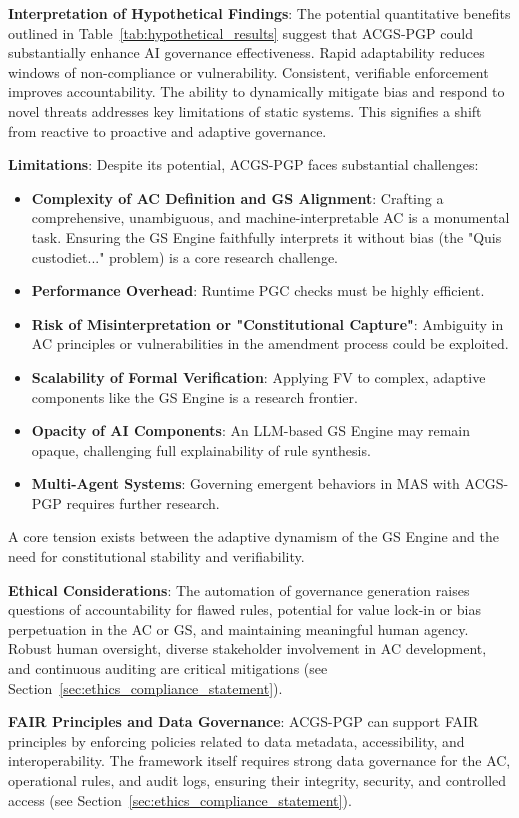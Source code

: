 \documentclass[sigconf,review,anonymous=false]{acmart} %
\begin{document}
\textbf{Interpretation of Hypothetical Findings}: The potential quantitative benefits outlined in Table~\ref{tab:hypothetical_results} suggest that ACGS-PGP could substantially enhance AI governance effectiveness. Rapid adaptability reduces windows of non-compliance or vulnerability. Consistent, verifiable enforcement improves accountability. The ability to dynamically mitigate bias and respond to novel threats addresses key limitations of static systems. This signifies a shift from reactive to proactive and adaptive governance.

\textbf{Limitations}: Despite its potential, ACGS-PGP faces substantial challenges:
\begin{itemize}
    \item \textbf{Complexity of AC Definition and GS Alignment}: Crafting a comprehensive, unambiguous, and machine-interpretable AC is a monumental task. Ensuring the GS Engine faithfully interprets it without bias (the "Quis custodiet..." problem) is a core research challenge.
    \item \textbf{Performance Overhead}: Runtime PGC checks must be highly efficient.
    \item \textbf{Risk of Misinterpretation or "Constitutional Capture"}: Ambiguity in AC principles or vulnerabilities in the amendment process could be exploited.
    \item \textbf{Scalability of Formal Verification}: Applying FV to complex, adaptive components like the GS Engine is a research frontier.
    \item \textbf{Opacity of AI Components}: An LLM-based GS Engine may remain opaque, challenging full explainability of rule synthesis.
    \item \textbf{Multi-Agent Systems}: Governing emergent behaviors in MAS with ACGS-PGP requires further research.
\end{itemize}
A core tension exists between the adaptive dynamism of the GS Engine and the need for constitutional stability and verifiability.

\textbf{Ethical Considerations}: The automation of governance generation raises questions of accountability for flawed rules, potential for value lock-in or bias perpetuation in the AC or GS, and maintaining meaningful human agency. Robust human oversight, diverse stakeholder involvement in AC development, and continuous auditing are critical mitigations (see Section~\ref{sec:ethics_compliance_statement}).

\textbf{FAIR Principles and Data Governance}: ACGS-PGP can support FAIR principles by enforcing policies related to data metadata, accessibility, and interoperability. The framework itself requires strong data governance for the AC, operational rules, and audit logs, ensuring their integrity, security, and controlled access (see Section~\ref{sec:ethics_compliance_statement}).
\end{document}
